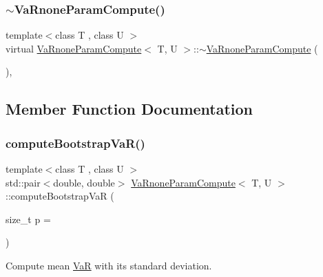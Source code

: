 \subsubsection{\texorpdfstring{$\sim$\+Va\+Rnone\+Param\+Compute()}{~VaRnoneParamCompute()}}
{\footnotesize\ttfamily template$<$class T , class U $>$ \\
virtual \hyperlink{classVaRnoneParamCompute}{Va\+Rnone\+Param\+Compute}$<$ T, U $>$\+::$\sim$\hyperlink{classVaRnoneParamCompute}{Va\+Rnone\+Param\+Compute} (\begin{DoxyParamCaption}{ }\end{DoxyParamCaption})\hspace{0.3cm}{\ttfamily [inline]}, {\ttfamily [virtual]}}



\subsection{Member Function Documentation}
\hypertarget{classVaRnoneParamCompute_ad1c8f84e6efd21924d24258bc5ac3933}{}\label{classVaRnoneParamCompute_ad1c8f84e6efd21924d24258bc5ac3933} 
\subsubsection{\texorpdfstring{compute\+Bootstrap\+Va\+R()}{computeBootstrapVaR()}}
{\footnotesize\ttfamily template$<$class T , class U $>$ \\
std\+::pair$<$double, double$>$ \hyperlink{classVaRnoneParamCompute}{Va\+Rnone\+Param\+Compute}$<$ T, U $>$\+::compute\+Bootstrap\+VaR (\begin{DoxyParamCaption}\item[{size\+\_\+t}]{p = {} }\end{DoxyParamCaption})\hspace{0.3cm}{\ttfamily [inline]}}



Compute mean \hyperlink{classVaR}{VaR} with its standard deviation. 

\hypertarget{classVaRnoneParamCompute_a171ea43cd1a1a9a38cf415c22e06898a}{}\label{classVaRnoneParamCompute_a171ea43cd1a1a9a38cf415c22e06898a} 
